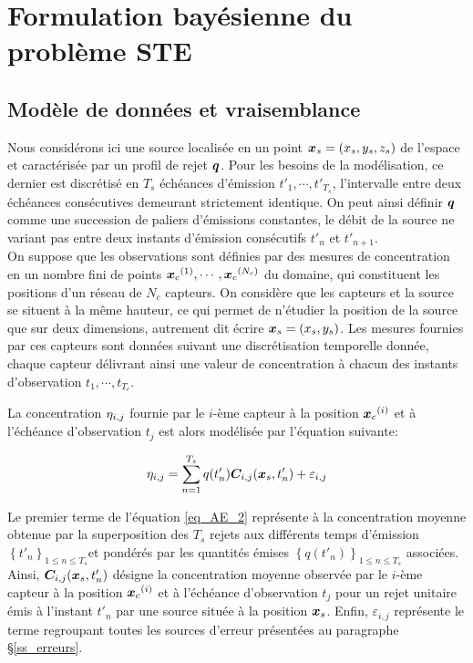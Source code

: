 \section{Formulation bayésienne du problème STE}

\subsection{Modèle de données et vraisemblance}

Nous considérons ici une source localisée en un point ${\bm{x}_s} = (x_s, y_s, z_s)$ de l'espace et caractérisée par un profil de rejet ${\bm{q}}$. Pour les besoins de la modélisation, ce dernier est discrétisé en $T_s$ échéances d'émission $t'_1, \cdots, t'_{T_s}$, l'intervalle entre deux échéances consécutives demeurant strictement identique. On peut ainsi définir ${\bm{q}}$ comme une succession de paliers d'émissions constantes, le débit de la source ne variant pas entre deux instants d'émission consécutifs $t'_n$ et $t'_{n+1}$.\\


On suppose que les observations sont définies par des mesures de concentration en un nombre fini de points $ {\bm{x}_c}^{(1)}, \cdots, {\bm{x}_c}^{(N_c)}$ du domaine, qui constituent les positions d'un réseau de $N_c$ capteurs. On considère que les capteurs et la source se situent à la même hauteur, ce qui permet de n'étudier la position de la source que sur deux dimensions, autrement dit écrire ${\bm{x}_s} = (x_s, y_s)$. Les mesures fournies par ces capteurs sont données suivant une discrétisation temporelle donnée, chaque capteur délivrant ainsi une valeur de concentration à chacun des instants d'observation $t_1, \cdots, t_{T_c}$.




 La concentration ${\eta}_{i,j}$ fournie par le $i$-ème capteur à la position ${\bm{x}_c}^{(i)}$ et à l'échéance d'observation $t_j$ est alors modélisée par l'équation suivante: 
 
\begin{equation}
{\eta}_{i,j} = \sum\limits_{n=1}^{T_s}q(t'_n){\bm{C}}_{i,j}({\bm{x}_s}, t'_n) + \varepsilon_{i,j}
\label{eq_AE_2}
\end{equation}

Le premier terme de l'équation \eqref{eq_AE_2} représente à la concentration moyenne obtenue par la superposition des $T_s$ rejets aux  différents temps d'émission $\left\{t'_n\right\}_{1\leq n \leq T_s}$et pondérés par les quantités émises $\left\{q(t'_n)\right\}_{1 \leq n \leq T_s}$ associées. Ainsi, ${\bm{C}}_{i,j}({\bm{x}_s}, t'_n)$ désigne la concentration moyenne observée par le $i$-ème capteur à la position ${\bm{x}_c}^{(i)}$ et à l'échéance d'observation $t_j$ pour un rejet unitaire  émis à l'instant $t'_n$ par une source située à la position ${\bm{x}_s}$. Enfin, $\varepsilon_{i,j}$ représente le terme regroupant toutes les sources d'erreur présentées au paragraphe §\ref{ss_erreurs}.\\

